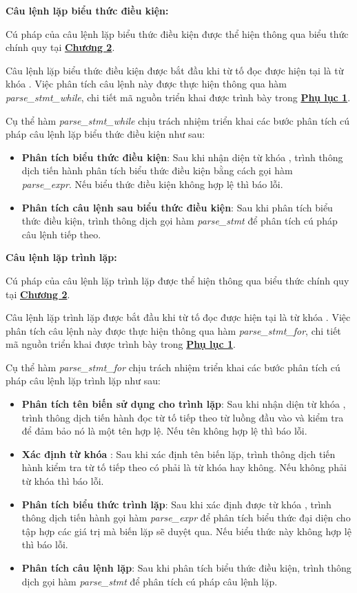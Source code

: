 \textbf{Câu lệnh lặp biểu thức điều kiện:}

Cú pháp của câu lệnh lặp biểu thức điều kiện được thể hiện thông qua biểu thức chính quy tại \hyperref[ch2:while_stmt]{\bf Chương 2}.

Câu lệnh lặp biểu thức điều kiện được bắt đầu khi từ tố đọc được hiện tại là từ khóa . Việc phân tích câu lệnh này được thực hiện thông qua hàm \textit{parse\_stmt\_while}, chi tiết mã nguồn triển khai được trình bày trong \hyperref[ap1:stmt_during]{\bf Phụ lục 1}. %

Cụ thể hàm \textit{parse\_stmt\_while} chịu trách nhiệm triển khai các bước phân tích cú pháp câu lệnh lặp biểu thức điều kiện như sau:
\begin{itemize}
    \item \textbf{Phân tích biểu thức điều kiện}:
    Sau khi nhận diện từ khóa , trình thông dịch tiến hành phân tích biểu thức điều kiện bằng cách gọi hàm \\\textit{parse\_expr}. Nếu biểu thức điều kiện không hợp lệ thì báo lỗi.
    \item \textbf{Phân tích câu lệnh sau biểu thức điều kiện}:
    Sau khi phân tích biểu thức điều kiện, trình thông dịch gọi hàm \textit{parse\_stmt} để phân tích cú pháp câu lệnh tiếp theo.
\end{itemize}

\textbf{Câu lệnh lặp trình lặp:} 

Cú pháp của câu lệnh lặp trình lặp được thể hiện thông qua biểu thức chính quy tại \hyperref[ch2:while_stmt]{\bf Chương 2}.

Câu lệnh lặp trình lặp được bắt đầu khi từ tố đọc được hiện tại là từ khóa . Việc phân tích câu lệnh này được thực hiện thông qua hàm \textit{parse\_stmt\_for}, chi tiết mã nguồn triển khai được trình bày trong \hyperref[ap1:stmt_for]{\bf Phụ lục 1}. %

Cụ thể hàm \textit{parse\_stmt\_for} chịu trách nhiệm triển khai các bước phân tích cú pháp câu lệnh lặp trình lặp như sau:

\begin{itemize}
    \item \textbf{Phân tích tên biến sử dụng cho trình lặp}:
    Sau khi nhận diện từ khóa , trình thông dịch tiến hành đọc từ tố tiếp theo từ luồng đầu vào và kiểm tra để đảm bảo nó là một tên hợp lệ. Nếu tên không hợp lệ thì báo lỗi. %
    \item \textbf{Xác định từ khóa }:
    Sau khi xác định tên biến lặp, trình thông dịch tiến hành kiểm tra từ tố tiếp theo có phải là từ khóa  hay không. Nếu không phải từ khóa  thì báo lỗi. %
    \item \textbf{Phân tích biểu thức trình lặp}:
    Sau khi xác định được từ khóa , trình thông dịch tiến hành gọi hàm \textit{parse\_expr} để phân tích biểu thức đại diện cho tập hợp các giá trị mà biến lặp sẽ duyệt qua. Nếu biểu thức này không hợp lệ thì báo lỗi. %
    \item \textbf{Phân tích câu lệnh lặp}:
    Sau khi phân tích biểu thức điều kiện, trình thông dịch gọi hàm \textit{parse\_stmt} để phân tích cú pháp câu lệnh lặp.
\end{itemize}

